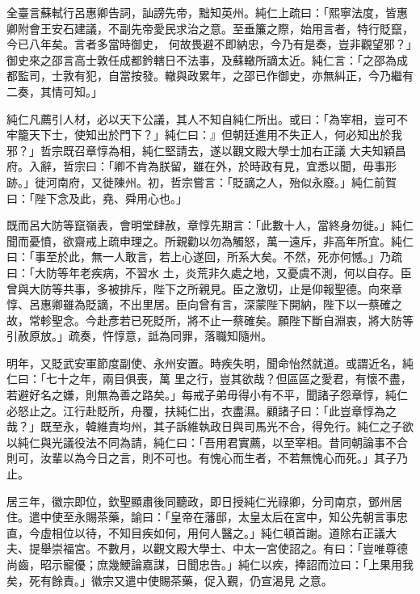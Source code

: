 \begin{pinyinscope}
 全臺言蘇軾行呂惠卿告詞，訕謗先帝，黜知英州。純仁上疏曰：「熙寧法度，皆惠卿附會王安石建議，不副先帝愛民求治之意。至垂簾之際，始用言者，特行貶竄，今已八年矣。言者多當時御史，
 何故畏避不即納忠，今乃有是奏，豈非觀望邪？」御史來之邵言高士敦任成都鈐轄日不法事，及蘇轍所謫太近。純仁言：「之邵為成都監司，士敦有犯，自當按發。轍與政累年，之邵已作御史，亦無糾正，今乃繼有二奏，其情可知。」



 純仁凡薦引人材，必以天下公議，其人不知自純仁所出。或曰：「為宰相，豈可不牢籠天下士，使知出於門下？」純仁曰：』但朝廷進用不失正人，何必知出於我邪？」哲宗既召章惇為相，純仁堅請去，遂以觀文殿大學士加右正議
 大夫知穎昌府。入辭，哲宗曰：「卿不肯為朕留，雖在外，於時政有見，宜悉以聞，毋事形跡。」徙河南府，又徙陳州。初，哲宗嘗言：「貶謫之人，殆似永廢。」純仁前賀曰：「陛下念及此，堯、舜用心也。」



 既而呂大防等竄嶺表，會明堂肆赦，章惇先期言：「此數十人，當終身勿徙。」純仁聞而憂憤，欲齋戒上疏申理之。所親勸以勿為觸怒，萬一遠斥，非高年所宜。純仁曰：「事至於此，無一人敢言，若上心遂回，所系大矣。不然，死亦何憾。」乃疏曰：「大防等年老疾病，不習水
 土，炎荒非久處之地，又憂虞不測，何以自存。臣曾與大防等共事，多被排斥，陛下之所親見。臣之激切，止是仰報聖德。向來章惇、呂惠卿雖為貶謫，不出里居。臣向曾有言，深蒙陛下開納，陛下以一蔡確之故，常軫聖念。今赴彥若已死貶所，將不止一蔡確矣。願陛下斷自淵衷，將大防等引赦原放。」疏奏，忤惇意，詆為同罪，落職知隨州。



 明年，又貶武安軍節度副使、永州安置。時疾失明，聞命怡然就道。或謂近名，純仁曰：「七十之年，兩目俱喪，萬
 里之行，豈其欲哉？但區區之愛君，有懷不盡，若避好名之嫌，則無為善之路矣。」每戒子弟毋得小有不平，聞諸子怨章惇，純仁必怒止之。江行赴貶所，舟覆，扶純仁出，衣盡濕。顧諸子曰：「此豈章惇為之哉？」既至永，韓維責均州，其子訴維執政日與司馬光不合，得免行。純仁之子欲以純仁與光議役法不同為請，純仁曰：「吾用君實薦，以至宰相。昔同朝論事不合則可，汝輩以為今日之言，則不可也。有愧心而生者，不若無愧心而死。」其子乃止。



 居三年，徽宗即位，欽聖顯肅後同聽政，即日授純仁光祿卿，分司南京，鄧州居住。遣中使至永賜茶藥，諭曰：「皇帝在藩邸，太皇太后在宮中，知公先朝言事忠直，今虛相位以待，不知目疾如何，用何人醫之。」純仁頓首謝。道除右正議大夫、提舉崇福宮。不數月，以觀文殿大學士、中太一宮使詔之。有曰：「豈唯尊德尚齒，昭示寵優；庶幾鯁論嘉謀，日聞忠告。」純仁以疾，捧詔而泣曰：「上果用我矣，死有餘責。」徽宗又遣中使賜茶藥，促入覲，仍宣渴見
 之意。




\end{pinyinscope}
